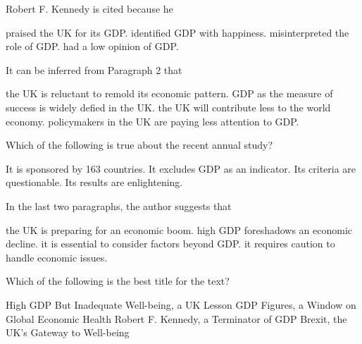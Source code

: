 \item Robert F. Kennedy is cited because he
\begin{tasks}
	\task praised the UK for its GDP.
	\task identified GDP with happiness.
	\task misinterpreted the role of GDP.
	\task had a low opinion of GDP.
\end{tasks}
\item It can be inferred from Paragraph 2 that
\begin{tasks}
	\task the UK is reluctant to remold its economic pattern.
	\task GDP as the measure of success is widely defied in the UK.
	\task the UK will contribute less to the world economy.
	\task policymakers in the UK are paying less attention to GDP.
\end{tasks}
\item Which of the following is true about the recent annual study?
\begin{tasks}
	\task It is sponsored by 163 countries.
	\task It excludes GDP as an indicator.
	\task Its criteria are questionable.
	\task Its results are enlightening.
\end{tasks}
\item In the last two paragraphs, the author suggests that
\begin{tasks}
	\task the UK is preparing for an economic boom.
	\task high GDP foreshadows an economic decline.
	\task it is essential to consider factors beyond GDP.
	\task it requires caution to handle economic issues.
\end{tasks}
\item Which of the following is the best title for the text?
\begin{tasks}
	\task High GDP But Inadequate Well-being, a UK Lesson
	\task GDP Figures, a Window on Global Economic Health
	\task Robert F. Kennedy, a Terminator of GDP
	\task Brexit, the UK's Gateway to Well-being
\end{tasks}